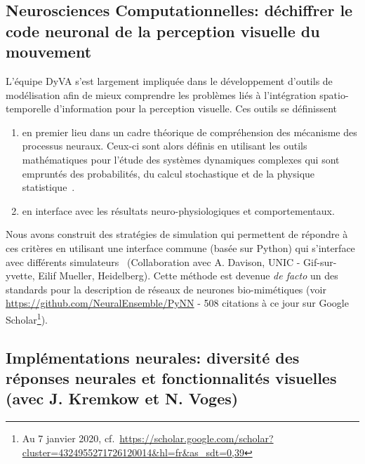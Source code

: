 \documentclass[11pt,french,a4paper,oneside]{article}%
\begin{document}
\subsection{Neurosciences Computationnelles: déchiffrer le code neuronal de la perception visuelle du mouvement}

L'équipe DyVA s'est largement impliquée dans le développement d'outils de modélisation afin de mieux comprendre les problèmes liés à l'intégration spatio-temporelle d'information pour la perception visuelle. Ces outils se définissent
\begin{enumerate}
\item en premier lieu dans un cadre théorique de compréhension des mécanisme des processus neuraux. Ceux-ci sont alors définis en utilisant les outils mathématiques pour l'étude des systèmes dynamiques complexes qui sont empruntés des probabilités, du calcul stochastique et de la physique statistique~\citep{Dauce10}.
\item en interface avec les résultats neuro-physiologiques et comportementaux. 
\end{enumerate}
Nous avons construit des stratégies de simulation qui permettent de répondre à ces critères en utilisant une interface commune (basée sur Python) qui s'interface avec différents simulateurs~\citep{Davison07cns,Davison08} (Collaboration avec A. Davison, UNIC - Gif-sur-yvette, Eilif Mueller, Heidelberg). Cette méthode est devenue \emph{de facto} un des standards pour la description de réseaux de neurones bio-mimétiques (voir \url{https://github.com/NeuralEnsemble/PyNN} - 508 citations à ce jour sur Google Scholar\footnote{Au 7 janvier 2020, cf.~\url{https://scholar.google.com/scholar?cluster=4324955271726120014&hl=fr&as_sdt=0,39}}).

\subsection{Implémentations neurales: diversité des réponses neurales et fonctionnalités visuelles (avec J. Kremkow et N. Voges)}
\end{document}
